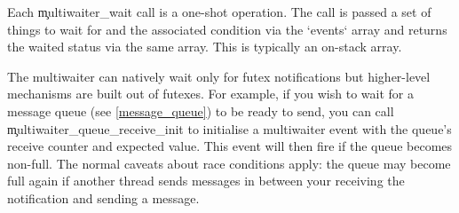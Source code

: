 
Each \c{multiwaiter_wait} call is a one-shot operation.
The call is passed a set of things to wait for and the associated condition via the `events` array and returns the waited status via the same array.
This is typically an on-stack array.


The multiwaiter can natively wait only for futex notifications but higher-level mechanisms are built out of futexes.
For example, if you wish to wait for a message queue (see \ref{message_queue}) to be ready to send, you can call \c{multiwaiter_queue_receive_init} to initialise a multiwaiter event with the queue's receive counter and expected value.
This event will then fire if the queue becomes non-full.
The normal caveats about race conditions apply: the queue may become full again if another thread sends messages in between your receiving the notification and sending a message.

